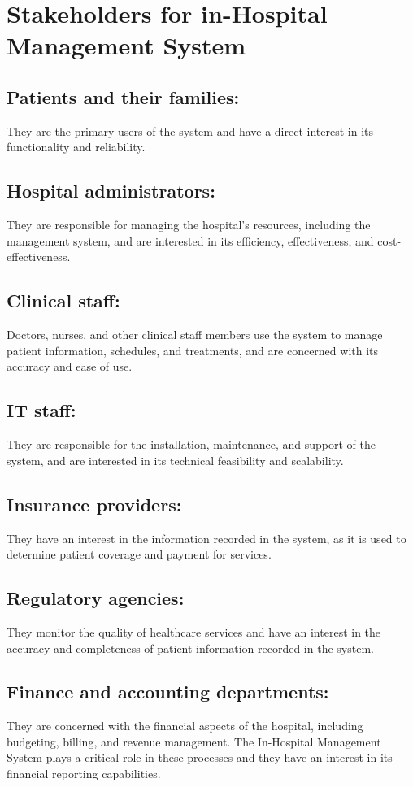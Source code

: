  \section{Stakeholders for in-Hospital Management System}
 \subsection{Patients and their families:}They are the primary users of the system and have a direct interest in its functionality and reliability.
 \subsection{Hospital administrators:} They are responsible for managing the hospital's resources, including the management system, and are interested in its efficiency, effectiveness, and cost-effectiveness.
 \subsection{Clinical staff:} Doctors, nurses, and other clinical staff members use the system to manage patient information, schedules, and treatments, and are concerned with its accuracy and ease of use.
 \subsection{IT staff:} They are responsible for the installation, maintenance, and support of the system, and are interested in its technical feasibility and scalability.
 \subsection{Insurance providers:} They have an interest in the information recorded in the system, as it is used to determine patient coverage and payment for services.
 \subsection{Regulatory agencies:} They monitor the quality of healthcare services and have an interest in the accuracy and completeness of patient information recorded in the system.
 \subsection{Finance and accounting departments:} They are concerned with the financial aspects of the hospital, including budgeting, billing, and revenue management. The In-Hospital Management System plays a critical role in these processes and they have an interest in its financial reporting capabilities.

